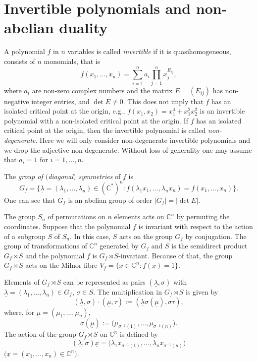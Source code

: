 \section{Invertible polynomials and non-abelian duality} \label{sect:invertible_poly}
A polynomial $f$ in $n$ variables is called {\em invertible} if it is quasihomogeneous, consists of $n$ monomials, that is
\[ f(x_1, \dots , x_n)=\sum_{i=1}^n a_i \prod_{j=1}^n x_j^{E_{ij}} ,
\]
where $a_i$ are non-zero complex numbers and the matrix $E=(E_{ij})$ has non-negative integer entries, and
$\det E \neq 0$. This does not imply that $f$ has an isolated critical point at the origin, e.g., $f(x_1,x_2)=x_1^4+x_1^2x_2^2$ is an invertible polynomial with a non-isolated critical point at the origin. If $f$ has an isolated critical point at the origin, then the invertible polynomial is called {\em non-degenerate}. Here we will only consider non-degenerate invertible polynomials and we drop the adjective non-degenerate. Without loss of generality one may assume
that $a_i=1$ for $i=1, \dots , n$.

The {\em group of $($diagonal$)$ symmetries} of $f$ is
\[
G_f=\big\{\underline{\lambda}=(\lambda_1, \dots, \lambda_n)\in({\mathbb C}^*)^n\colon
f(\lambda_1x_1, \dots, \lambda_nx_n)=f(x_1, \dots, x_n)\big\} .
\]
One can see that $G_f$ is an abelian group of order $\vert G_f \vert = \vert\det E \vert$.

The group $S_n$ of permutations on $n$ elements acts on ${\mathbb C}^n$ by permuting the coordinates. Suppose that the polynomial $f$ is invariant with respect to the action of a subgroup $S$ of $S_n$. In this case, $S$ acts on the group $G_f$ by conjugation. The group of transformations of ${\mathbb C}^n$ generated by $G_f$ and $S$ is the semidirect product $G_f \rtimes S$ and the polynomial $f$ is $G_f \rtimes S$-invariant. Because of that, the group $G_f \rtimes S$ acts on the Milnor fibre $V_f=\big\{ \underline{x} \in {\mathbb C}^n \colon f(\underline{x})=1 \big\}$.

\begin{Remark}Elements of $G_f \rtimes S$ can be represented as pairs $(\underline{\lambda}, \sigma)$ with
$\underline{\lambda}=(\lambda_1, \dots , \lambda_n) \in G_f$, $\sigma \in S$. The multiplication in
$G_f \rtimes S$ is given by
\[
(\underline{\lambda}, \sigma) \cdot (\underline{\mu}, \tau) :=
(\underline{\lambda} \sigma(\underline{\mu}), \sigma \tau) ,
\]
where, for $\underline{\mu}=(\mu_1, \dots , \mu_n)$,
\[
\sigma(\underline{\mu}):= \big(\mu_{\sigma^{-1}(1)}, \dots , \mu_{\sigma^{-1}(n)}\big) .
\]
The action of the group $G_f \rtimes S$ on ${\mathbb C}^n$ is defined by
\[
(\underline{\lambda}, \sigma)\underline{x} = \big(\lambda_1x_{\sigma^{-1}(1)}, \dots , \lambda_nx_{\sigma^{-1}(n)}\big)
\]
$\big(\underline{x}=(x_1, \dots , x_n) \in {\mathbb C}^n\big)$.
\end{Remark}

